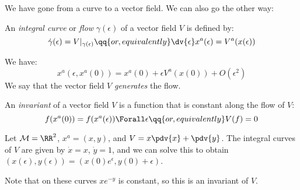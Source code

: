 \documentclass{jknotes}
\begin{document}
We have gone from a curve to a vector field. We can also go the other way:
\begin{defn}
    An \emph{integral curve} or \emph{flow} \(\gamma(\epsilon)\) of a vector field \(V\) is defined by:
    \begin{equation}
        \dot{\gamma}(\epsilon) = V|_{\gamma(\epsilon)}
        \qq{or, equivalently}
        \dv{\epsilon}x^a(\epsilon) = V^a(x(\epsilon))
    \end{equation}
\end{defn}
We have:
\begin{equation}
    x^a(\epsilon,x^a(0)) = x^a(0) + \epsilon V^a(x(0)) + O(\epsilon^2)
\end{equation}
We say that the vector field \(V\) \emph{generates} the flow.
\begin{defn}
    An \emph{invariant} of a vector field \(V\) is a function that is constant along the flow of \(V\):
    \begin{equation}
        f(x^a(0)) = f(x^a(\epsilon)) \Forall \epsilon
        \qq{or, equivalently}
        V(f) = 0
    \end{equation}
\end{defn}
\begin{eg}
    Let \(\mathcal{M}=\RR^2\), \(x^a = (x,y)\), and \(V = x\pdv{x}+\pdv{y}\). The integral curves of \(V\) are given by \(\dot{x}=x\), \(\dot{y}=1\), and we can solve this to obtain \((x(\epsilon),y(\epsilon)) = (x(0)e^\epsilon,y(0)+\epsilon)\).
    \begin{figure}[H]
        \centering
    \end{figure}
    Note that on these curves \(xe^{-y}\) is constant, so this is an invariant of \(V\).
\end{eg}
\end{document}
